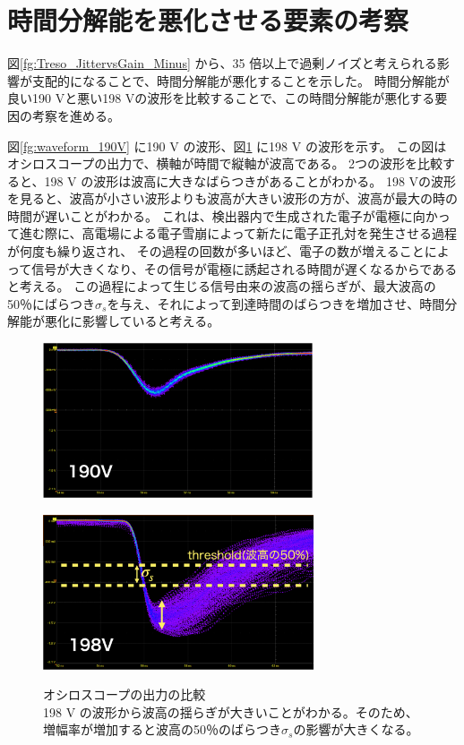 \section{時間分解能を悪化させる要素の考察}
図\ref{fg:Treso_JittervsGain_Minus} から、35 倍以上で過剰ノイズと考えられる影響が支配的になることで、時間分解能が悪化することを示した。
時間分解能が良い190 Vと悪い198 Vの波形を比較することで、この時間分解能が悪化する要因の考察を進める。

図\ref{fg:waveform_190V} に190 V の波形、図\ref{fg:waveform_198V} に198 V の波形を示す。
この図はオシロスコープの出力で、横軸が時間で縦軸が波高である。
2つの波形を比較すると、198 V の波形は波高に大きなばらつきがあることがわかる。
198 Vの波形を見ると、波高が小さい波形よりも波高が大きい波形の方が、波高が最大の時の時間が遅いことがわかる。
これは、検出器内で生成された電子が電極に向かって進む際に、高電場による電子雪崩によって新たに電子正孔対を発生させる過程が何度も繰り返され、
その過程の回数が多いほど、電子の数が増えることによって信号が大きくなり、その信号が電極に誘起される時間が遅くなるからであると考える。
この過程によって生じる信号由来の波高の揺らぎが、最大波高の50％にばらつき$\sigma_s$を与え、それによって到達時間のばらつきを増加させ、時間分解能が悪化に影響していると考える。

\begin{figure}[h]
    \begin{minipage}[b]{0.5\linewidth}
        \centering
        \includegraphics[width=8cm]{fig/ch5/waveform_190V.png}
        \label{fg:waveform_190V}
    \end{minipage}
    \begin{minipage}[b]{0.5\linewidth}
        \centering
        \includegraphics[width=8cm]{fig/ch5/waveform_198V.png}
        \label{fg:waveform_198V}
    \end{minipage}
    \caption[オシロスコープの出力の比較]{オシロスコープの出力の比較\\198 V の波形から波高の揺らぎが大きいことがわかる。そのため、増幅率が増加すると波高の50％のばらつき$\sigma_s$の影響が大きくなる。}
\end{figure}

